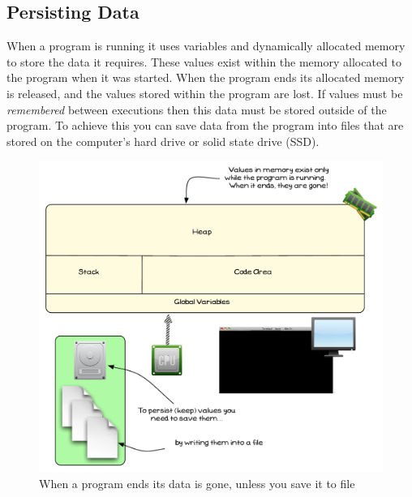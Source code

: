 \clearpage
\subsection{Persisting Data} %
\label{sub:persisting_data}

When a program is running it uses variables and dynamically allocated memory to store the data it requires. These values exist within the memory allocated to the program when it was started. When the program ends its allocated memory is released, and the values stored within the program are lost. If values must be \emph{remembered} between executions then this data must be stored outside of the program. To achieve this you can save data from the program into files that are stored on the computer's hard drive or solid state drive (SSD).

\begin{figure}[h]
   \centering
   \includegraphics[width=\textwidth]{./topics/file-io/diagrams/PersistData} 
   \caption{When a program ends its data is gone, unless you save it to file}
   \label{fig:persist-data}
\end{figure}


